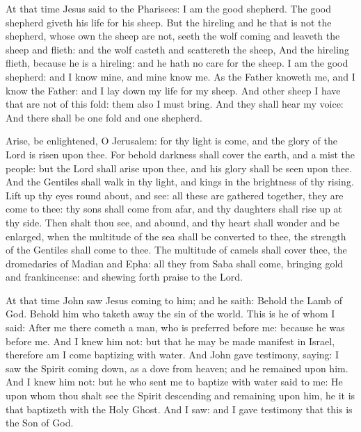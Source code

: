 
At that time Jesus said to the Pharisees:
I am the good shepherd. The good shepherd giveth his life for his
sheep.
But the hireling and he that is not the shepherd, whose own the
sheep are not, seeth the wolf coming and leaveth the sheep and flieth:
and the wolf casteth and scattereth the sheep,
And the hireling flieth, because he is a hireling: and he hath no
care for the sheep.
I am the good shepherd: and I know mine, and mine know me.
As the Father knoweth me, and I know the Father: and I lay down
my life for my sheep.
And other sheep I have that are not of this fold: them also I
must bring. And they shall hear my voice: And there shall be one fold
and one shepherd.

 
\bigskip




Arise, be enlightened, O Jerusalem: for thy light is come, and the
glory of the Lord is risen upon thee.
For behold darkness shall cover the earth, and a mist the people:
but the Lord shall arise upon thee, and his glory shall be seen upon
thee.
And the Gentiles shall walk in thy light, and kings in the
brightness of thy rising.
Lift up thy eyes round about, and see: all these are gathered
together, they are come to thee: thy sons shall come from afar, and thy
daughters shall rise up at thy side.
Then shalt thou see, and abound, and thy heart shall wonder and be
enlarged, when the multitude of the sea shall be converted to thee, the
strength of the Gentiles shall come to thee.
The multitude of camels shall cover thee, the dromedaries of
Madian and Epha: all they from Saba shall come, bringing gold and
frankincense: and shewing forth praise to the Lord.

\medskip


At that time John saw Jesus coming to him; and he saith: Behold
the Lamb of God. Behold him who taketh away the sin of the world.
This is he of whom I said: After me there cometh a man, who is
preferred before me: because he was before me.
And I knew him not: but that he may be made manifest in Israel,
therefore am I come baptizing with water.
And John gave testimony, saying: I saw the Spirit coming down, as
a dove from heaven; and he remained upon him.
And I knew him not: but he who sent me to baptize with water said
to me: He upon whom thou shalt see the Spirit descending and remaining
upon him, he it is that baptizeth with the Holy Ghost.
And I saw: and I gave testimony that this is the Son of God.



